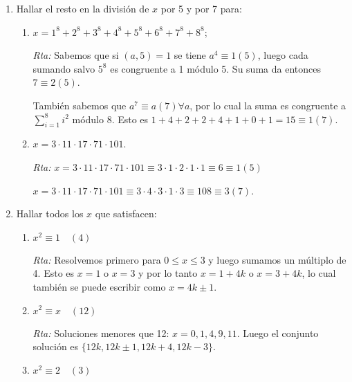 \documentclass[12pt,spanish,makeidx]{amsbook}
\newcommand{\rta}{\noindent\textit{Rta: }}
\begin{document}
\begin{enumerate}
	\rta Para encontrar dichas cifras tenemos que tomar congruencia módulo 100.
	$7^{15}=(7^2)^77=(50-1)^77\equiv (50\cdot7-1)7 (100)$ donde hemos usado la fórmula binomial para $(50-1)^7$ y el hecho que $50^n\equiv 0 (100)$ para $n>1$. Finalmente $(50\cdot7-1)7\equiv (50-1)7\equiv 343\equiv43 (100)$.
	
	
	\smallskip
	\item Hallar el resto en la división de $x$ por 5 y por 7 para:
	\begin{enumerate}
		\item $x=1^8 + 2^8 + 3^8 + 4^8 + 5^8 + 6^8 + 7^8 + 8^8$;
			
		\rta Sabemos que si $(a,5)=1$ se tiene $a^4\equiv 1 (5)$, luego cada sumando salvo $5^8$ es congruente a 1 módulo 5. 
		Su suma da entonces $7\equiv2 (5)$.
		
		También sabemos que $a^7\equiv a (7) \forall a$, por lo cual la suma es congruente a $\sum_{i=1}^8i^2$ módulo 8.
		Esto es $1+4+2+2+4+1+0+1=15\equiv1 (7)$.
		
		\item $x=3\cdot 11\cdot 17\cdot 71\cdot 101$.
			
		\rta $ x = 3 \cdot11\cdot17 \cdot 71 \cdot101\equiv 3 \cdot1 \cdot2 \cdot1 \cdot1\equiv 6\equiv 1 (5)$
		
		$ x = 3\cdot11\cdot17 \cdot 71 \cdot101\equiv 3\cdot4\cdot3\cdot1\cdot3\equiv 108\equiv3 (7)$.
		
		
	\end{enumerate}
	
	\smallskip

	
	
	\item Hallar todos los $x$ que satisfacen:
	\begin{enumerate}
		\item $x^2 \equiv1 \quad(4)$\quad
		
		\rta Resolvemos primero para $0\le x\le3$ y luego sumamos un múltiplo de 4. Esto es $x= 1$ o $x=3$ y por lo tanto $x=1+4k$ o $x=3+4k$, lo cual también se puede escribir como $x=4k\pm 1$.
		
		\item$x^2  \equiv x\quad (12)$ 
		
		\rta Soluciones menores que 12: $x=0, 1, 4, 9, 11.$ Luego el conjunto solución es $\{12k, 12k\pm1, 12k+4, 12k-3\}$.
		
		\item $x^2  \equiv 2 \quad(3)$\quad
		

\end{enumerate}
\end{enumerate}
\end{document}
